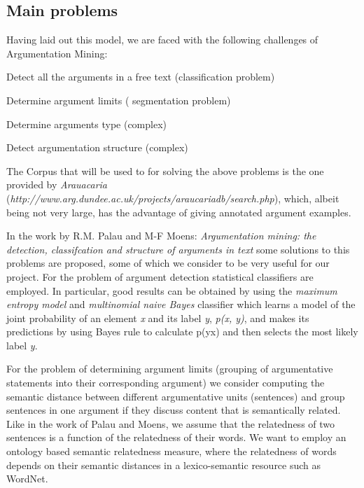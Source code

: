 \documentclass[lnbip]{svmultln}
\begin{document}
\subsection{Main problems}
\par
Having laid out this model, we are faced with the following challenges of Argumentation Mining: 
\begin{description}
\item Detect all the arguments in a free text (classification problem)
\item Determine argument limits ( segmentation problem)
\item Determine arguments type (complex)
\item Detect argumentation structure (complex)
\end{description}

\par
The Corpus that will be used to for solving the above problems is the one provided by \textit{Arauacaria} (\textit {http://www.arg.dundee.ac.uk/projects/araucariadb/search.php}), which, albeit being not very large, has the advantage of giving annotated argument examples.

\par
In the work by R.M. Palau and M-F Moens:  \textit{Argumentation mining: the detection, classifcation and structure of arguments in text} some solutions to this problems are proposed, some of which we consider to be very useful for our project.
For the problem of argument detection statistical classifiers are employed. In particular, good results can be obtained by using the \textit{maximum entropy model} and \textit{multinomial naive Bayes} classifier which learns a model of the joint probability of an element \textit{x} and its label \textit{y}, \textit{p(x, y)}, and makes its predictions by using Bayes rule to calculate p(y\textbar x) and then selects the most likely label \textit{y}.

\par
For the problem of determining argument limits (grouping of argumentative statements into their corresponding argument) we consider computing the semantic distance between different argumentative units (sentences) and group sentences in one argument if they discuss content that is semantically related. Like in the work of Palau and Moens, we assume that the relatedness of two sentences is a function of the relatedness of their words. We want to employ an ontology based semantic relatedness measure, where the relatedness of words depends on their semantic distances in a lexico-semantic resource such as WordNet.
\end{document}
